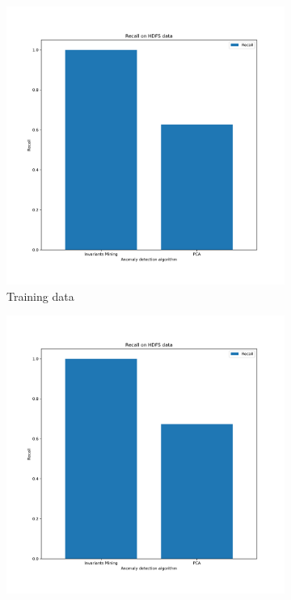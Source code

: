 \documentclass[12pt,a4paper]{article}
\begin{document}
	\vspace{-0.4cm}
	\begin{figure}[H]
		\centering
		\begin{subfigure}[H]{0.45\textwidth}
			\centering
			\includegraphics[width=1.3\textwidth]{Figures/Recall_2}
			
			\vspace{-0.3cm}
			\caption{Training data}
		\end{subfigure}
		\hfill
		\begin{subfigure}[H]{0.45\textwidth}
			\centering
			\includegraphics[width=1.3\textwidth]{Figures/Recall_2_test}
			

\end{subfigure}
\end{figure}
\end{document}
